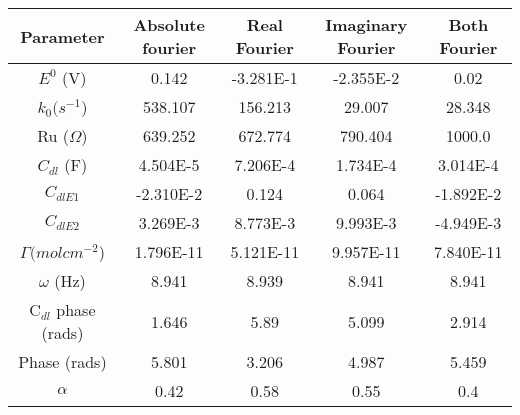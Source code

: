 \documentclass[preview]{standalone}
\begin{document}
\begin{center}
\begin{tabular}{|c|c|c|c|c|}
\hline
Parameter & Absolute fourier & Real Fourier & Imaginary Fourier & Both Fourier\\
\hline\hline
$E^0$ (V) & 0.142 & -3.281E-1 & -2.355E-2 & 0.02 \\
\hline
$k_0 (s^{-1}$) & 538.107 & 156.213 & 29.007 & 28.348 \\
\hline
Ru ($\Omega$) & 639.252 & 672.774 & 790.404 & 1000.0 \\
\hline
$C_{dl}$ (F) & 4.504E-5 & 7.206E-4 & 1.734E-4 & 3.014E-4 \\
\hline
$C_{dlE1}$& -2.310E-2 & 0.124 & 0.064 & -1.892E-2 \\
\hline
$C_{dlE2}$& 3.269E-3 & 8.773E-3 & 9.993E-3 & -4.949E-3 \\
\hline
$\Gamma (mol cm^{-2}$) & 1.796E-11 & 5.121E-11 & 9.957E-11 & 7.840E-11 \\
\hline
$\omega$ (Hz) & 8.941 & 8.939 & 8.941 & 8.941 \\
\hline
C$_{dl}$ phase (rads) & 1.646 & 5.89 & 5.099 & 2.914 \\
\hline
Phase (rads) & 5.801 & 3.206 & 4.987 & 5.459 \\
\hline
$\alpha$& 0.42 & 0.58 & 0.55 & 0.4 \\
\hline
\end{tabular}
\end{center}
\end{document}
